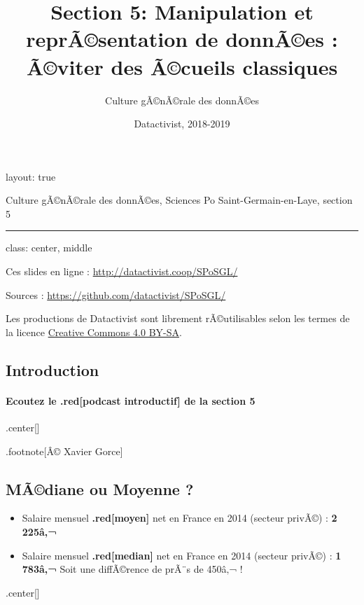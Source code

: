 \documentclass[]{article}
\title{Section 5: Manipulation et reprÃ©sentation de donnÃ©es : Ã©viter des
Ã©cueils classiques}
\subtitle{Culture gÃ©nÃ©rale des donnÃ©es}
\author{Datactivist, 2018-2019}
\date{}
\providecommand{\tightlist}{%
  \setlength{\itemsep}{0pt}\setlength{\parskip}{0pt}}
\let\oldparagraph\paragraph
\renewcommand{\paragraph}[1]{\oldparagraph{#1}\mbox{}}
\begin{document}
\maketitle

layout: true

{Culture gÃ©nÃ©rale des donnÃ©es, Sciences Po Saint-Germain-en-Laye,
section 5}

\begin{center}\rule{0.5\linewidth}{\linethickness}\end{center}

class: center, middle

Ces slides en ligne : \url{http://datactivist.coop/SPoSGL/}

Sources : \url{https://github.com/datactivist/SPoSGL/}

Les productions de Datactivist sont librement rÃ©utilisables selon les
termes de la licence
\href{https://creativecommons.org/licenses/by-sa/4.0/legalcode.fr}{Creative
Commons 4.0 BY-SA}.

\subsection{Introduction}\label{introduction}

\paragraph{Ecoutez le .red{[}podcast introductif{]} de la section
5}\label{ecoutez-le-.redpodcast-introductif-de-la-section-5}

.center{[}{]}

.footnote{[}Â© Xavier Gorce{]}

\subsection{MÃ©diane ou Moyenne ?}\label{madiane-ou-moyenne}

\begin{itemize}
\tightlist
\item
  Salaire mensuel \textbf{.red{[}moyen{]}} net en France en 2014
  (secteur privÃ©) : \textbf{2 225â‚¬}
\item
  Salaire mensuel \textbf{.red{[}median{]}} net en France en 2014
  (secteur privÃ©) : \textbf{1 783â‚¬} Soit une diffÃ©rence de prÃ¨s de
  450â‚¬ !
\end{itemize}

.center{[}\href{https://www.insee.fr/fr/statistiques/2121609\#consulter}{}{]}
\end{document}
